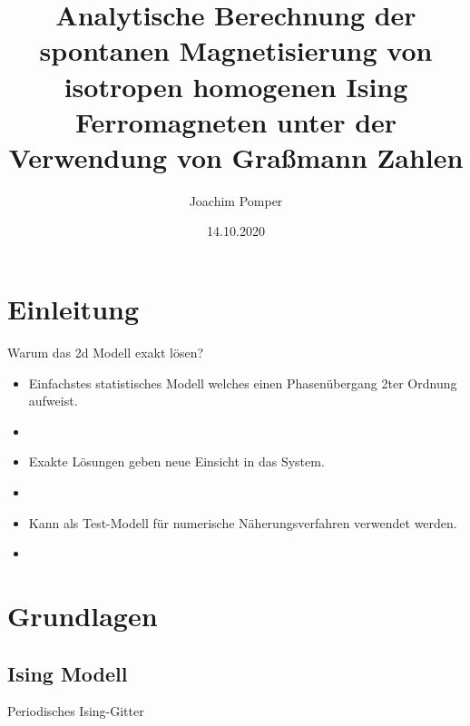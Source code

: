 \documentclass[11pt]{beamer}
\author{Joachim Pomper}
\title{Analytische Berechnung der spontanen Magnetisierung von isotropen homogenen Ising Ferromagneten unter der Verwendung von Graßmann Zahlen}
\institute{Technische Universität Graz}
\date{14.10.2020}
\begin{document}
\begin{frame}
\titlepage
\end{frame}

\begin{frame}
\tableofcontents
\end{frame}

\section{Einleitung}
    
    \begin{frame}{Warum das 2d Modell exakt lösen?}
        \begin{itemize}
            \item Einfachstes statistisches Modell welches einen Phasenübergang 2ter Ordnung aufweist.
            \item[]
            \pause
            \item Exakte Lösungen geben neue Einsicht in das System.
            \item[]
            \pause
            \item Kann als Test-Modell für numerische Näherungsverfahren verwendet werden.
            \item[]
        \end{itemize}
    \end{frame}

\section{Grundlagen}
\subsection{Ising Modell}
    \begin{frame}{Periodisches Ising-Gitter}
        \begin{figure}[h]
            \centering
            
        \end{figure}
    \end{frame}
    
\end{document}

